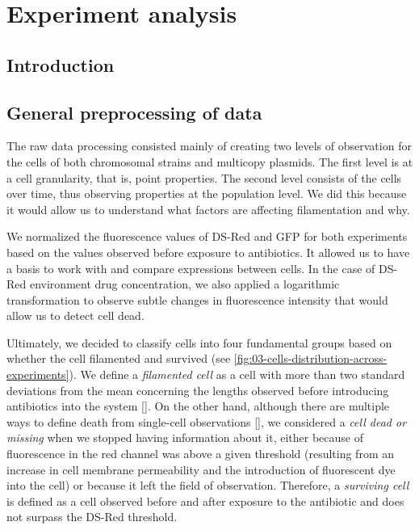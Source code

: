 \documentclass[a4paper, nobind]{templates/ociamthesis}
\begin{document}
\adjustmtc
{}

\hypertarget{experiment-analysis}{%
\chapter{Experiment analysis}\label{experiment-analysis}}

\minitoc 

\hypertarget{introduction-1}{%
\section{Introduction}\label{introduction-1}}

\hypertarget{general-preprocessing-of-data}{%
\section{General preprocessing of data}\label{general-preprocessing-of-data}}

The raw data processing consisted mainly of creating two levels of observation for the cells of both chromosomal strains and multicopy plasmids.
The first level is at a cell granularity, that is, point properties.
The second level consists of the cells over time, thus observing properties at the population level.
We did this because it would allow us to understand what factors are affecting filamentation and why.

We normalized the fluorescence values of DS-Red and GFP for both experiments based on the values observed before exposure to antibiotics.
It allowed us to have a basis to work with and compare expressions between cells.
In the case of DS-Red environment drug concentration, we also applied a logarithmic transformation to observe subtle changes in fluorescence intensity that would allow us to detect cell dead.

Ultimately, we decided to classify cells into four fundamental groups based on whether the cell filamented and survived (see \ref{fig:03-cells-distribution-across-experiments}).
We define a \emph{filamented cell} as a cell with more than two standard deviations from the mean concerning the lengths observed before introducing antibiotics into the system {[}{]}.
On the other hand, although there are multiple ways to define death from single-cell observations {[}{]}, we considered a \emph{cell dead or missing} when we stopped having information about it, either because of fluorescence in the red channel was above a given threshold (resulting from an increase in cell membrane permeability and the introduction of fluorescent dye into the cell) or because it left the field of observation.
Therefore, a \emph{surviving cell} is defined as a cell observed before and after exposure to the antibiotic and does not surpass the DS-Red threshold.
\end{document}
